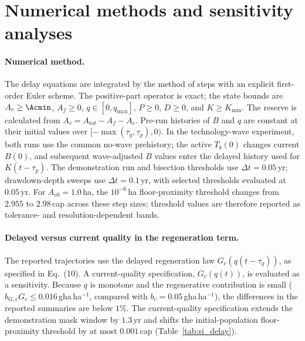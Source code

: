 \section{Numerical methods and sensitivity analyses}\label{si:numerics}

\paragraph{Numerical method.} The delay equations are integrated by the method of steps with an explicit first-order Euler scheme. The positive-part operator is exact; the state bounds are $A_c\ge\Acmin$, $A_f\ge0$, $q\in[0,q_{\max}]$, $P\ge0$, $D\ge0$, and $K\ge K_{\min}$. The reserve is calculated from $A_r=A_{tot}-A_f-A_c$. Pre-run histories of $B$ and $q$ are constant at their initial values over $[-\max(\tau_g,\tau_p),0)$. In the technology-wave experiment, both runs use the common no-wave prehistory; the active $T_b(0)$ changes current $B(0)$, and subsequent wave-adjusted $B$ values enter the delayed history used for $K(t-\tau_p)$. The demonstration run and bisection thresholds use $\Delta t=0.05$\,yr; drawdown-depth sweeps use $\Delta t=0.1$\,yr, with selected thresholds evaluated at $0.05$\,yr. For $A_{c0}=1.0$\,ha, the $10^{-6}$\,ha floor-proximity threshold changes from $2.955$ to $2.98$\,cap across these step sizes; threshold values are therefore reported as tolerance- and resolution-dependent bands.

\paragraph{Delayed versus current quality in the regeneration term.} The reported trajectories use the delayed regeneration law $G_c(q(t-\tau_g))$, as specified in Eq.~(10). A current-quality specification, $G_c(q(t))$, is evaluated as a sensitivity. Because $q$ is monotone and the regenerative contribution is small ($b_{G,c}G_c\le0.016$\,gha\,ha$^{-1}$, compared with $b_c=0.05$\,gha\,ha$^{-1}$), the differences in the reported summaries are below $1\%$. The current-quality specification extends the demonstration mask window by $1.3$\,yr and shifts the initial-population floor-proximity threshold by at most $0.001$\,cap (Table~\ref{tab:si_delay}).

